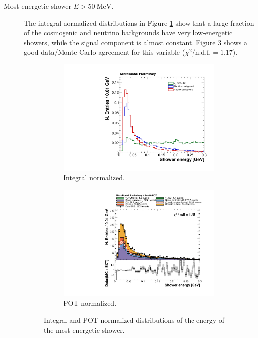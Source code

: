 \begin{description}
\item[Most energetic shower $E > 50~\mathrm{MeV}$.] The integral-normalized distributions in Figure \ref{fig:showere_integral} show that a large fraction of the cosmogenic and neutrino backgrounds have very low-energetic showers, while the signal component is almost constant. Figure \ref{fig:showere_pot} shows a good data/Monte Carlo agreement for this variable ($\chi^2 / \mathrm{n.d.f.} = 1.17$).

\begin{figure}[htbp]
\centering
  \begin{subfigure}{0.45\textwidth}
    \includegraphics[width=\linewidth]{figures/h_shower_energy_norm.pdf}
    \caption{Integral normalized.} \label{fig:showere_integral}
  \end{subfigure}
    \begin{subfigure}{0.45\textwidth}
    \includegraphics[width=\linewidth]{figures/h_shower_energy.pdf}
    \caption{POT normalized.} \label{fig:showere_pot}
  \end{subfigure}
  \caption{Integral and POT normalized distributions of the energy of the most energetic shower.}
\end{figure}


\end{description}
